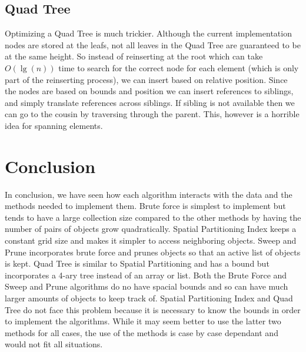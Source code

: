 \documentclass[conference]{IEEEtran}
\begin{document}
\subsection{Quad Tree}
Optimizing a Quad Tree is much trickier. Although the current implementation nodes are stored at the leafs, not all leaves in the Quad Tree are guaranteed to be at the same height. So instead of reinserting at the root which can take $O(\lg(n))$ time to search for the correct node for each element (which is only part of the reinserting process), we can insert based on relative position. Since the nodes are based on bounds and position we can insert references to siblings, and simply translate references across siblings. If sibling is not available then we can go to the cousin by traversing through the parent. This, however is a horrible idea for spanning elements.

\section{Conclusion}
In conclusion, we have seen how each algorithm interacts with the data and the methods needed to implement them. Brute force is simplest to implement but tends to have a large collection size compared to the other methods by having the number of pairs of objects grow quadratically. Spatial Partitioning Index keeps a constant grid size and makes it simpler to access neighboring objects. Sweep and Prune incorporates brute force and prunes objects so that an active list of objects is kept. Quad Tree is similar to Spatial Partitioning and has a bound but incorporates a 4-ary tree instead of an array or list. Both the Brute Force and Sweep and Prune algorithms do no have spacial bounds and so can have much larger amounts of objects to keep track of. Spatial Partitioning Index and Quad Tree do not face this problem because it is necessary to know the bounds in order to implement the algorithms. While it may seem better to use the latter two methods for all cases, the use of the methods is case by case dependant and would not fit all situations. 
\end{document}
